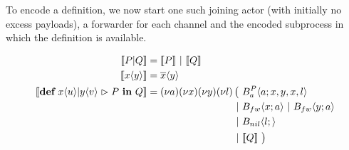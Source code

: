 To encode a \joincalc definition,
we now start one such joining actor (with initially no excess payloads),
a forwarder for each channel
and the encoded subprocess in which the definition is available.

\begin{align*}
  \encMJtoAP{P \jpar Q}
  &= \encMJtoAP{P} \apar \encMJtoAP{Q}
  \\
  \encMJtoAP{\jsnd{x}{y}}
  &= \asnd{x}{y}
  \\
  \encMJtoAP{\jdef{\jrct{\jrcv{x}{u} \jpat \jrcv{y}{v}}{P}}{Q}}
  &= \anew{a}{\anew{x}{\anew{y}{\anew{l}{
    \begin{aligned}[t]
      \big(\ &\ains{B_a^P}{a}{x, y, x, l} \\
      \apar  &\ains{B_{fw}}{x}{a} \apar \ains{B_{fw}}{y}{a} \\
      \apar  &\ains{B_{nil}}{l}{} \\
      \apar  &\encMJtoAP{Q}
      \ \big)
    \end{aligned}
  }}}}
\end{align*}


